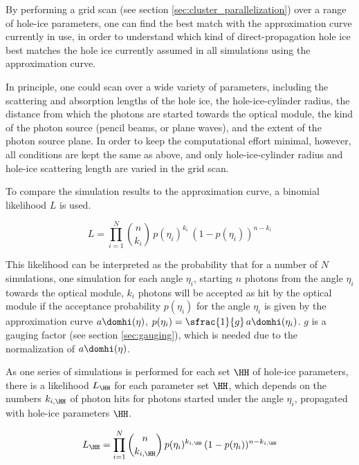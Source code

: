 By performing a grid scan (see section \ref{sec:cluster_parallelization}) over a range of hole-ice parameters, one can find the best match with the approximation curve currently in use, in order to understand which kind of direct-propagation hole ice best matches the hole ice currently assumed in all simulations using the approximation curve.



In principle, one could scan over a wide variety of parameters, including the scattering and absorption lengths of the hole ice, the hole-ice-cylinder radius, the distance from which the photons are started towards the optical module, the kind of the photon source (pencil beams, or plane waves), and the extent of the photon source plane. In order to keep the computational effort minimal, however, all conditions are kept the same as above, and only hole-ice-cylinder radius and hole-ice scattering length are varied in the grid scan.

To compare the simulation results to the approximation curve, a binomial likelihood $L$ is used.

\begin{equation}
  L = \prod_{i=1}^N \binom{n}{k_i}\,p(\eta_i)^{k_i}\,(1-p(\eta_i))^{n-k_i}
\end{equation}

This likelihood can be interpreted as the probability that for a number of $N$ simulations, one simulation for each angle $\eta_i$, starting $n$ photons from the angle $\eta_i$ towards the optical module, $k_i$ photons will be accepted as hit by the optical module if the acceptance probability $p(\eta_i)$ for the angle $\eta_i$ is given by the approximation curve $a\domhi(\eta)$, $p(\eta_i) = \sfrac{1}{g}\,a\domhi(\eta_i)$. $g$ is a gauging factor (see section \ref{sec:gauging}), which is needed due to the normalization of $a\domhi(\eta)$.

As one series of simulations is performed for each set $\HH$ of hole-ice parameters, there is a likelihood $L_\HH$ for each parameter set $\HH$, which depends on the numbers $k_{i,\HH}$ of photon hits for photons started under the angle $\eta_i$, propagated with hole-ice parameters $\HH$.

$$
  L_\HH = \prod_{i=1}^N \binom{n}{k_{i,\HH}}\,p(\eta_i)^{k_{i,\HH}}\,(1-p(\eta_i))^{n-k_{i,\HH}}
$$


